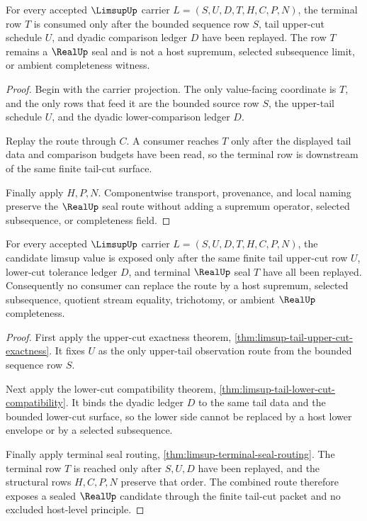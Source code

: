 \begin{theorem}
\label{thm:limsup-terminal-seal-routing}
For every accepted $\LimsupUp$ carrier $L=(S,U,D,T,H,C,P,N)$, the terminal row $T$ is consumed only after the bounded sequence row $S$, tail upper-cut schedule $U$, and dyadic comparison ledger $D$ have been replayed. The row $T$ remains a $\RealUp$ seal and is not a host supremum, selected subsequence limit, or ambient completeness witness.
\end{theorem}
\begin{proof}
Begin with the carrier projection. The only value-facing coordinate is $T$, and the only rows that feed it are the bounded source row $S$, the upper-tail schedule $U$, and the dyadic lower-comparison ledger $D$.

Replay the route through $C$. A consumer reaches $T$ only after the displayed tail data and comparison budgets have been read, so the terminal row is downstream of the same finite tail-cut surface.

Finally apply $H,P,N$. Componentwise transport, provenance, and local naming preserve the $\RealUp$ seal route without adding a supremum operator, selected subsequence, or completeness field.
\end{proof}

\begin{theorem}
\label{thm:limsup-tail-seal-scope}
For every accepted $\LimsupUp$ carrier $L=(S,U,D,T,H,C,P,N)$, the candidate limsup value is exposed only after the same finite tail upper-cut row $U$, lower-cut tolerance ledger $D$, and terminal $\RealUp$ seal $T$ have all been replayed. Consequently no consumer can replace the route by a host supremum, selected subsequence, quotient stream equality, trichotomy, or ambient $\RealUp$ completeness.
\end{theorem}
\begin{proof}
First apply the upper-cut exactness theorem, \autoref{thm:limsup-tail-upper-cut-exactness}. It fixes $U$ as the only upper-tail observation route from the bounded sequence row $S$.

Next apply the lower-cut compatibility theorem, \autoref{thm:limsup-tail-lower-cut-compatibility}. It binds the dyadic ledger $D$ to the same tail data and the bounded lower-cut surface, so the lower side cannot be replaced by a host lower envelope or by a selected subsequence.

Finally apply terminal seal routing, \autoref{thm:limsup-terminal-seal-routing}. The terminal row $T$ is reached only after $S,U,D$ have been replayed, and the structural rows $H,C,P,N$ preserve that order. The combined route therefore exposes a sealed $\RealUp$ candidate through the finite tail-cut packet and no excluded host-level principle.
\end{proof}

